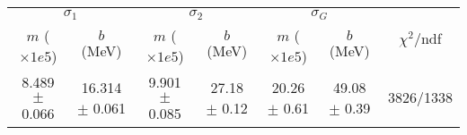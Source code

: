 \begin{tabular}{cc|cc|cc||c}
\multicolumn{2}{c|}{$\sigma_1$} & \multicolumn{2}{|c}{$\sigma_2$} & \multicolumn{2}{|c}{$\sigma_G$}  & \multirow{2}{*}{$\chi^2/$ndf}\\
$m$ ($\times1e5$) & $b$ (MeV) & $m$ ($\times1e5$) & $b$ (MeV) & $m$ ($\times1e5$) & $b$ (MeV) & \\
\hline
8.489 $\pm$ 0.066 & 16.314 $\pm$ 0.061 & 9.901 $\pm$ 0.085 & 27.18 $\pm$ 0.12 & 20.26 $\pm$ 0.61 & 49.08 $\pm$ 0.39 & 3826/1338\\
\end{tabular}
